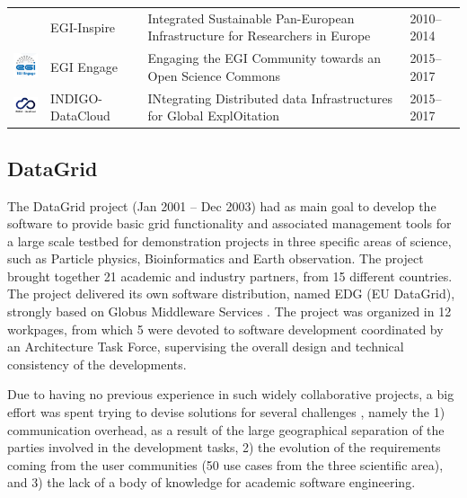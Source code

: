 \documentclass[journal]{IEEEtran}
\begin{document}
\begin{table}[!h]
\begin{tabular}{p{1.6cm}p{1.5cm}p{3cm}l}
\begin{minipage}{.3\textwidth}
\end{minipage}
     & EGI-Inspire &
Integrated Sustainable Pan-European Infrastructure for Researchers in Europe
 & 2010--2014\\
\begin{minipage}{.3\textwidth}
\includegraphics[width=15mm,height=7.5mm]{images/egi_engage}
\end{minipage}
     & EGI Engage &
Engaging the EGI Community towards an Open Science Commons
 & 2015--2017\\
\begin{minipage}{.3\textwidth}
\includegraphics[width=15mm,height=7.5mm]{images/indigo}
\end{minipage}
     & INDIGO-DataCloud &
INtegrating Distributed data Infrastructures for Global ExplOitation
 & 2015--2017\\
\hline
\hline
\end{tabular}
\end{table}



\subsection{DataGrid}

The DataGrid \cite{cordis:datagrid} project (Jan 2001 -- Dec 2003) 
had as main goal to develop the software to provide basic grid functionality
and associated management tools for a large scale testbed for demonstration projects in three
specific areas of science, such as Particle physics, Bioinformatics and Earth observation.
The project brought together 21 academic and industry partners, from 15 different
countries. 
The project delivered its own software distribution, named EDG (EU DataGrid), strongly 
based on Globus Middleware Services \cite{globus}. The project was organized in 12 workpages, from 
which 5 were devoted to software development coordinated by an 
Architecture Task Force, supervising the overall design and technical consistency 
of the developments.

Due to having no previous experience in such widely
collaborative projects, a big effort was spent trying to devise solutions for several
challenges \cite{datagrid}, namely the 1) communication overhead, as a
result of the large geographical separation of the parties involved in the
development tasks, 2) the evolution of the requirements coming from the user
communities (50 use cases from the three scientific area), and 3) the lack of a body 
of knowledge for academic software engineering.
\end{document}
